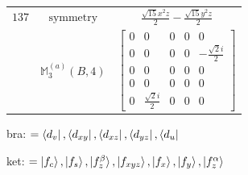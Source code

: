 \documentclass[fleqn,8pt,landscape]{jsarticle}
\begin{document}
\begin{longtable}{ccc}
$ 137 $ & $ \text{symmetry} $ & $ \frac{\sqrt{15} x^{2} z}{2} - \frac{\sqrt{15} y^{2} z}{2} $ \\
$  $ & $ \mathbb{M}_{3}^{(a)}(B,4) $ & $ \begin{bmatrix} 0 & 0 & 0 & 0 & 0 \\ 0 & 0 & 0 & 0 & - \frac{\sqrt{2} i}{2} \\ 0 & 0 & 0 & 0 & 0 \\ 0 & 0 & 0 & 0 & 0 \\ 0 & \frac{\sqrt{2} i}{2} & 0 & 0 & 0 \end{bmatrix} $ \\ \hline
\end{longtable}
bra: $=\bra{d_{v}}, \bra{d_{xy}}, \bra{d_{xz}}, \bra{d_{yz}}, \bra{d_{u}}$

\noindent
ket: $=\ket{f_{c}}, \ket{f_{s}}, \ket{f_{z}^{\beta}}, \ket{f_{xyz}}, \ket{f_{x}}, \ket{f_{y}}, \ket{f_{z}^{\alpha}}$
\renewcommand{\arraystretch}{1.6}
\end{document}
